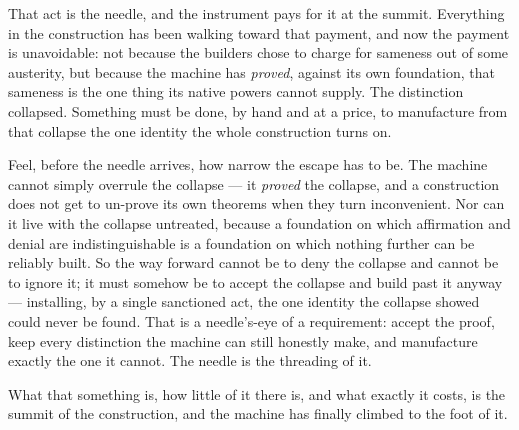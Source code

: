 That act is the needle, and the instrument pays for it at the summit. Everything in the construction has been
walking toward that payment, and now the payment is unavoidable: not because the builders chose to
charge for sameness out of some austerity, but because the machine has \emph{proved}, against its own foundation,
that sameness is the one thing its native powers cannot supply. The distinction collapsed. Something must be done,
by hand and at a price, to manufacture from that collapse the one identity the whole construction turns on.

Feel, before the needle arrives, how narrow the escape has to be. The machine cannot simply overrule the
collapse --- it \emph{proved} the collapse, and a construction does not get to un-prove its own theorems when they
turn inconvenient. Nor can it live with the collapse untreated, because a foundation on which affirmation and
denial are indistinguishable is a foundation on which nothing further can be reliably built. So the way forward
cannot be to deny the collapse and cannot be to ignore it; it must somehow be to accept the collapse and build
past it anyway --- installing, by a single sanctioned act, the one identity the collapse showed could never be
found. That is a needle's-eye of a requirement: accept the proof, keep every distinction the machine can still
honestly make, and manufacture exactly the one it cannot. The needle is the threading of it.

What that something is, how little of it there is, and what exactly it costs, is the summit of the construction,
and the machine has finally climbed to the foot of it.

